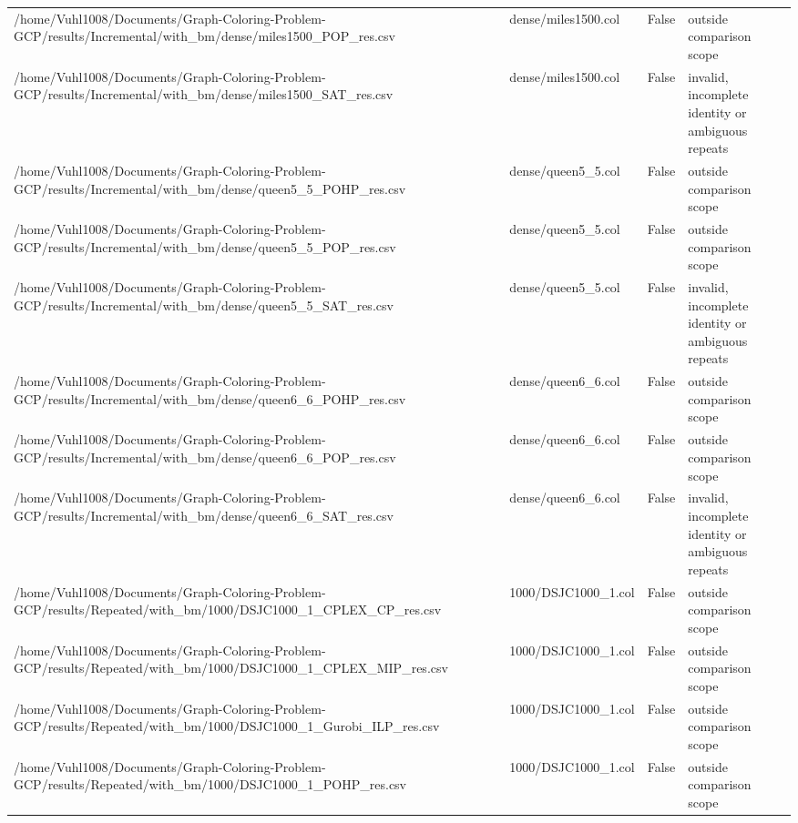 \begin{table}[htbp]
\begin{tabular}{llll}
/home/Vuhl1008/Documents/Graph-Coloring-Problem-GCP/results/Incremental/with\_bm/dense/miles1500\_POP\_res.csv & dense/miles1500.col & False & outside comparison scope \\
/home/Vuhl1008/Documents/Graph-Coloring-Problem-GCP/results/Incremental/with\_bm/dense/miles1500\_SAT\_res.csv & dense/miles1500.col & False & invalid, incomplete identity or ambiguous repeats \\
/home/Vuhl1008/Documents/Graph-Coloring-Problem-GCP/results/Incremental/with\_bm/dense/queen5\_5\_POHP\_res.csv & dense/queen5\_5.col & False & outside comparison scope \\
/home/Vuhl1008/Documents/Graph-Coloring-Problem-GCP/results/Incremental/with\_bm/dense/queen5\_5\_POP\_res.csv & dense/queen5\_5.col & False & outside comparison scope \\
/home/Vuhl1008/Documents/Graph-Coloring-Problem-GCP/results/Incremental/with\_bm/dense/queen5\_5\_SAT\_res.csv & dense/queen5\_5.col & False & invalid, incomplete identity or ambiguous repeats \\
/home/Vuhl1008/Documents/Graph-Coloring-Problem-GCP/results/Incremental/with\_bm/dense/queen6\_6\_POHP\_res.csv & dense/queen6\_6.col & False & outside comparison scope \\
/home/Vuhl1008/Documents/Graph-Coloring-Problem-GCP/results/Incremental/with\_bm/dense/queen6\_6\_POP\_res.csv & dense/queen6\_6.col & False & outside comparison scope \\
/home/Vuhl1008/Documents/Graph-Coloring-Problem-GCP/results/Incremental/with\_bm/dense/queen6\_6\_SAT\_res.csv & dense/queen6\_6.col & False & invalid, incomplete identity or ambiguous repeats \\
/home/Vuhl1008/Documents/Graph-Coloring-Problem-GCP/results/Repeated/with\_bm/1000/DSJC1000\_1\_CPLEX\_CP\_res.csv & 1000/DSJC1000\_1.col & False & outside comparison scope \\
/home/Vuhl1008/Documents/Graph-Coloring-Problem-GCP/results/Repeated/with\_bm/1000/DSJC1000\_1\_CPLEX\_MIP\_res.csv & 1000/DSJC1000\_1.col & False & outside comparison scope \\
/home/Vuhl1008/Documents/Graph-Coloring-Problem-GCP/results/Repeated/with\_bm/1000/DSJC1000\_1\_Gurobi\_ILP\_res.csv & 1000/DSJC1000\_1.col & False & outside comparison scope \\
/home/Vuhl1008/Documents/Graph-Coloring-Problem-GCP/results/Repeated/with\_bm/1000/DSJC1000\_1\_POHP\_res.csv & 1000/DSJC1000\_1.col & False & outside comparison scope \\

\end{tabular}
\end{table}
